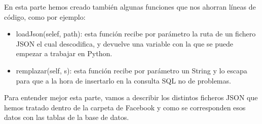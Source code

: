 En esta parte hemos creado también algunas funciones que nos ahorran líneas de código, como por ejemplo:
\begin{itemize}
	\item loadJson(selef, path): esta función recibe por parámetro la ruta de un fichero JSON el cual descodifica, y devuelve una variable con la que se puede empezar a trabajar en Python.
	\item remplazar(self, s): esta función recibe por parámetro un String y lo escapa para que a la hora de insertarlo en la consulta SQL no de problemas.	
\end{itemize}

Para entender mejor esta parte, vamos a describir los distintos ficheros JSON que  hemos tratado dentro de la carpeta de Facebook y como se corresponden esos datos con las tablas de la base de datos.
